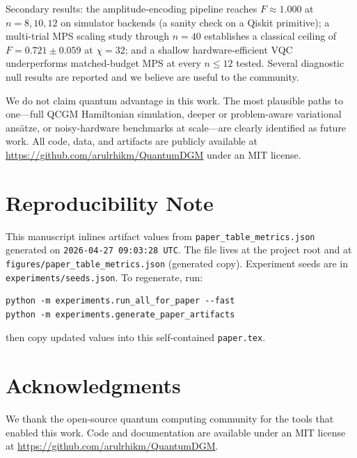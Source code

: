 \documentclass[conference,10pt]{IEEEtran}
\begin{document}
Secondary results: the amplitude-encoding pipeline reaches $F\approx1.000$ at $n=8,10,12$ on simulator backends (a sanity check on a Qiskit primitive); a multi-trial MPS scaling study through $n=40$ establishes a classical ceiling of $F=0.721\pm0.059$ at $\chi=32$; and a shallow hardware-efficient VQC underperforms matched-budget MPS at every $n\le12$ tested. Several diagnostic null results are reported and we believe are useful to the community.

We do not claim quantum advantage in this work. The most plausible paths to one---full QCGM Hamiltonian simulation, deeper or problem-aware variational ans\"atze, or noisy-hardware benchmarks at scale---are clearly identified as future work. All code, data, and artifacts are publicly available at \url{https://github.com/arulrhikm/QuantumDGM} under an MIT license.

\section*{Reproducibility Note}
This manuscript inlines artifact values from \texttt{paper\_table\_metrics.json} generated on \texttt{2026-04-27 09:03:28 UTC}. The file lives at the project root and at \texttt{figures/paper\_table\_metrics.json} (generated copy). Experiment seeds are in \texttt{experiments/seeds.json}. To regenerate, run:
\begin{verbatim}
python -m experiments.run_all_for_paper --fast
python -m experiments.generate_paper_artifacts
\end{verbatim}
then copy updated values into this self-contained \texttt{paper.tex}.

\section*{Acknowledgments}

We thank the open-source quantum computing community for the tools that enabled this work. Code and documentation are available under an MIT license at \url{https://github.com/arulrhikm/QuantumDGM}.
\end{document}
